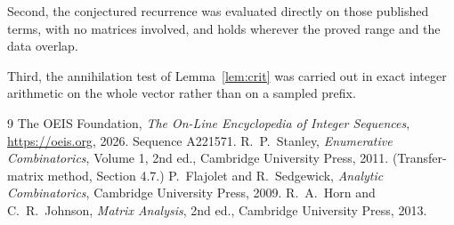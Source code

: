 \documentclass[11pt,a4paper]{article}
\theoremstyle{plain}
\theoremstyle{definition}
\begin{document}
Second, the conjectured recurrence was evaluated directly on those published terms, with no
matrices involved, and holds wherever the proved range and the data overlap.

Third, the annihilation test of Lemma~\ref{lem:crit} was carried out in exact integer
arithmetic on the whole vector rather than on a sampled prefix.

\begin{thebibliography}{9}
 The OEIS Foundation, \emph{The On-Line Encyclopedia of Integer
Sequences}, \url{https://oeis.org}, 2026. Sequence A221571.
 R.~P.~Stanley, \emph{Enumerative Combinatorics}, Volume 1, 2nd ed.,
Cambridge University Press, 2011. (Transfer-matrix method, Section 4.7.)
 P.~Flajolet and R.~Sedgewick, \emph{Analytic Combinatorics}, Cambridge
University Press, 2009.
 R.~A.~Horn and C.~R.~Johnson, \emph{Matrix Analysis}, 2nd ed., Cambridge
University Press, 2013.
\end{thebibliography}
\end{document}
